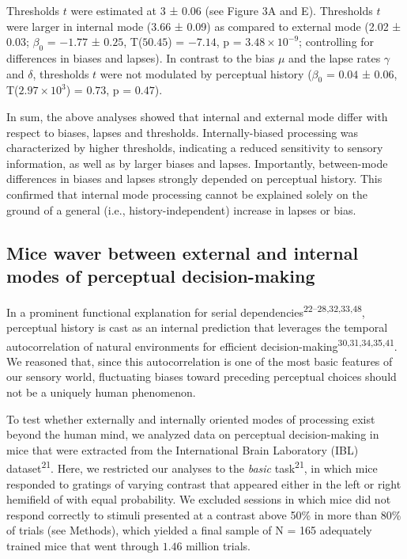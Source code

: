 \documentclass[
]{article}
\begin{document}
Thresholds \(t\) were estimated at 3 ± 0.06 (see Figure 3A and E).
Thresholds \(t\) were larger in internal mode (3.66 ± 0.09) as compared
to external mode (2.02 ± 0.03; \(\beta_0\) = \(-1.77\) ± \(0.25\),
T(\(50.45\)) = \(-7.14\), p = \(\ensuremath{3.48\times 10^{-9}}\);
controlling for differences in biases and lapses). In contrast to the
bias \(\mu\) and the lapse rates \(\gamma\) and \(\delta\), thresholds
\(t\) were not modulated by perceptual history (\(\beta_0\) = \(0.04\) ±
\(0.06\), T(\(\ensuremath{2.97\times 10^{3}}\)) = \(0.73\), p =
\(0.47\)).

In sum, the above analyses showed that internal and external mode differ
with respect to biases, lapses and thresholds. Internally-biased
processing was characterized by higher thresholds, indicating a reduced
sensitivity to sensory information, as well as by larger biases and
lapses. Importantly, between-mode differences in biases and lapses
strongly depended on perceptual history. This confirmed that internal
mode processing cannot be explained solely on the ground of a general
(i.e., history-independent) increase in lapses or bias.

\hypertarget{mice-waver-between-external-and-internal-modes-of-perceptual-decision-making}{%
\subsection{Mice waver between external and internal modes of perceptual
decision-making}\label{mice-waver-between-external-and-internal-modes-of-perceptual-decision-making}}

In a prominent functional explanation for serial
dependencies\textsuperscript{22--28,32,33,48}, perceptual history is
cast as an internal prediction that leverages the temporal
autocorrelation of natural environments for efficient
decision-making\textsuperscript{30,31,34,35,41}. We reasoned that, since
this autocorrelation is one of the most basic features of our sensory
world, fluctuating biases toward preceding perceptual choices should not
be a uniquely human phenomenon.

To test whether externally and internally oriented modes of processing
exist beyond the human mind, we analyzed data on perceptual
decision-making in mice that were extracted from the International Brain
Laboratory (IBL) dataset\textsuperscript{21}. Here, we restricted our
analyses to the \emph{basic} task\textsuperscript{21}, in which mice
responded to gratings of varying contrast that appeared either in the
left or right hemifield of with equal probability. We excluded sessions
in which mice did not respond correctly to stimuli presented at a
contrast above 50\% in more than 80\% of trials (see Methods), which
yielded a final sample of N = 165 adequately trained mice that went
through \(1.46\) million trials.
\end{document}
